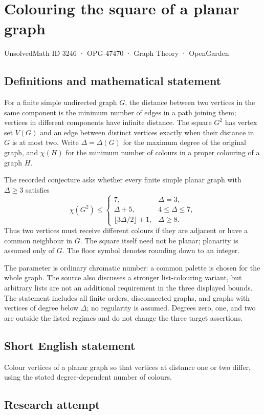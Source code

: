 \documentclass[11pt,a4paper]{article}
\begin{document}
\section*{Colouring the square of a planar graph}\label{3246}
{\small UnsolvedMath ID 3246 · OPG-47470 · Graph Theory · OpenGarden}
\subsection{Definitions and mathematical statement}
For a finite simple undirected graph $G$, the distance between two vertices
in the same component is the minimum number of edges in a path joining
them; vertices in different components have infinite distance. The square
$G^2$ has vertex set $V(G)$ and an edge between distinct vertices exactly
when their distance in $G$ is at most two. Write $\Delta=\Delta(G)$ for
the maximum degree of the original graph, and $\chi(H)$ for the minimum
number of colours in a proper colouring of a graph $H$.

The recorded conjecture asks whether every finite simple planar graph
with $\Delta\ge3$ satisfies
\[
 \chi(G^2)\le
 \begin{cases}
  7,&\Delta=3,\\
  \Delta+5,&4\le\Delta\le7,\\
  \lfloor3\Delta/2\rfloor+1,&\Delta\ge8.
 \end{cases}
\]
Thus two vertices must receive different colours if they are adjacent
or have a common neighbour in $G$. The square itself need not be planar;
planarity is assumed only of $G$. The floor symbol denotes rounding down
to an integer.

The parameter is ordinary chromatic number: a common palette is chosen
for the whole graph. The source also discusses a stronger list-colouring
variant, but arbitrary lists are not an additional requirement in the
three displayed bounds. The statement includes all finite orders,
disconnected graphs, and graphs with vertices of degree below $\Delta$;
no regularity is assumed. Degrees zero, one, and two are outside the
listed regimes and do not change the three target assertions.
\subsection{Short English statement}
Colour vertices of a planar graph so that vertices at distance one or two differ, using the stated degree-dependent number of colours.
\subsection{Research attempt}
\end{document}

